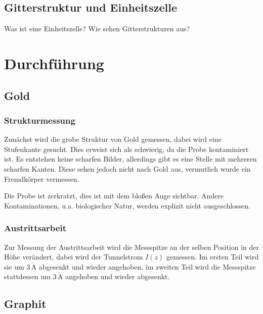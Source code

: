 \documentclass[12pt,a4paper]{scrartcl}
\numberwithin{equation}{section} %
\renewcommand{\[}{} %
\renewcommand{\]}{\noindent} %
\begin{document}
\hypertarget{gitterstruktur-und-einheitszelle}{%
\subsection{Gitterstruktur und
Einheitszelle}\label{gitterstruktur-und-einheitszelle}}

Was ist eine Einheitszelle? Wie sehen Gitterstrukturen aus?

\hypertarget{durchfuxfchrung}{%
\section{Durchführung}\label{durchfuxfchrung}}

\hypertarget{gold}{%
\subsection{Gold}\label{gold}}

\hypertarget{strukturmessung}{%
\subsubsection{Strukturmessung}\label{strukturmessung}}

Zunächst wird die grobe Struktur von Gold gemessen, dabei wird eine
Stufenkante gesucht. Dies erweist sich als schwierig, da die Probe
kontaminiert ist. Es entstehen keine scharfen Bilder, allerdings gibt es
eine Stelle mit mehreren scharfen Kanten. Diese sehen jedoch nicht nach
Gold aus, vermutlich wurde ein Fremdkörper vermessen.

Die Probe ist zerkratzt, dies ist mit dem bloßen Auge sichtbar. Andere
Kontaminationen, u.a. biologischer Natur, werden explizit nicht
ausgeschlossen.

\hypertarget{austrittsarbeit}{%
\subsubsection{Austrittsarbeit}\label{austrittsarbeit}}

Zur Messung der Austrittsarbeit wird die Messspitze an der selben
Position in der Höhe verändert, dabei wird der Tunnelstrom \(I(z)\)
gemessen. Im ersten Teil wird sie um \(3\,\mathrm{\mathring{A}}\)
abgesenkt und wieder angehoben, im zweiten Teil wird die Messspitze
stattdessen um \(3\,\mathrm{\mathring{A}}\) angehoben und wieder
abgesenkt.

\hypertarget{graphit}{%
\subsection{Graphit}\label{graphit}}
\end{document}

